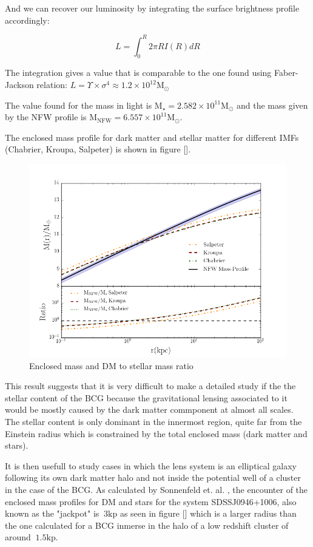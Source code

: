 And we can recover our luminosity by integrating the surface brightness profile accordingly:

\begin{equation}
L=\int_{0}^{R}2\pi RI(R)dR
\end{equation}

The integration gives a value that is comparable to the one found using Faber-Jackson relation: $L=\Upsilon\times\sigma^{4}\approx 1.2\times 10^{12}\text{M}_{\odot}$

The value found for the mass in light is $\text{M}_{\star}=2.582\times 10^{11}\text{M}_{\odot}$ and the mass given by the NFW profile is $\text{M}_{\text{NFW}}=6.557\times 10^{11}\text{M}_{\odot}$.

The enclosed mass profile for dark matter and stellar matter for different IMFs (Chabrier, Kroupa, Salpeter) is shown in figure [].

\begin{figure}[H]
\centering
\includegraphics[width=12cm]{images/DM_fraction_all_IMFs.png}
\caption[Enclosed mass and DM to stellar mass ratio]{Enclosed mass and DM to stellar mass ratio}
\end{figure}

This result suggests that it is very difficult to make a detailed study if the the stellar content of the BCG because the gravitational lensing associated to it would be mostly caused by the dark matter commponent at almost all scales. The stellar content is only dominant in the innermost region, quite far from the Einstein radius which is constrained by the total enclosed mass (dark matter and stars).

It is then usefull to study cases in which the lens system is an elliptical galaxy following its own dark matter halo and not inside the potential well of a cluster in the case of the BCG. As calculated by Sonnenfeld et. al. \citeyear{Reference15}, the encounter of the enclosed mass profiles for DM and stars for the system SDSSJ0946+1006, also known as the "jackpot" is $~3\text{kp}$ as seen in figure [] which is a larger radius than the one calculated for a BCG inmerse in the halo of a low redshift cluster of around $~1.5\text{kp}$.  

